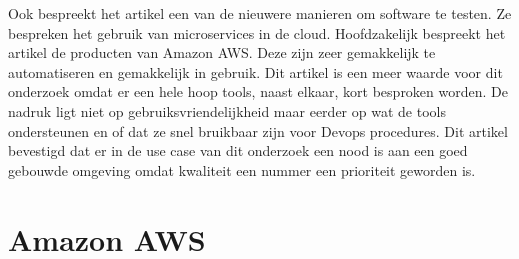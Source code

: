 \newline
\newline
Ook bespreekt het artikel \autocite{Ebert2016} een van de nieuwere manieren om software te testen. Ze bespreken het gebruik van microservices in de cloud. Hoofdzakelijk bespreekt het artikel de producten van Amazon AWS. Deze zijn zeer gemakkelijk te automatiseren en gemakkelijk in gebruik.
\newline
\newline
Dit artikel \autocite{Ebert2016} is een meer waarde voor dit onderzoek omdat er een hele hoop tools, naast elkaar, kort besproken worden. De nadruk ligt niet op gebruiksvriendelijkheid maar eerder op wat de tools ondersteunen en of dat ze snel bruikbaar zijn voor Devops procedures. Dit artikel bevestigd dat er in de use case van dit onderzoek een nood is aan een goed gebouwde omgeving omdat kwaliteit een nummer een prioriteit geworden is.
\newline
\newline
\section{Amazon AWS}
